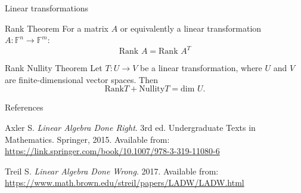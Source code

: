 \documentclass [aspectratio=169]{beamer}
\newcommand{\F}{{\mathbb{F}}}
\begin{document}
\begin{frame}{Linear transformations}
\begin{exampleblock}{Rank Theorem}
For a matrix $A$ or equivalently a linear transformation $A: \F^n \to \F^m$:
\begin{equation*}
\text{Rank } A = \text{Rank }  A^T 
\end{equation*}
\end{exampleblock}

\begin{exampleblock}{Rank Nullity Theorem}
Let $T:U \to V$ be a linear transformation, where $U$ and $V$ are finite-dimensional vector spaces. Then  
\begin{equation*}
\text{Rank} T + \text{Nullity}  T = \text{dim } U.
\end{equation*}
\end{exampleblock}

\end{frame}





\begin{frame}{References}

Axler S. \textit{Linear Algebra Done Right}. 3rd ed. Undergraduate Texts in Mathematics. Springer, 2015.
Available from: \href{https://link.springer.com/book/10.1007/978-3-319-11080-6}{https://link.springer.com/book/10.1007/978-3-319-11080-6} 

\vspace{1em}


\indent Treil S. \textit{Linear Algebra Done Wrong}. 2017. Available from: \href{https://www.math.brown.edu/streil/papers/LADW/LADW.html}{https://www.math.brown.edu/streil/papers/LADW/LADW.html}
\end{frame}
\end{document}
